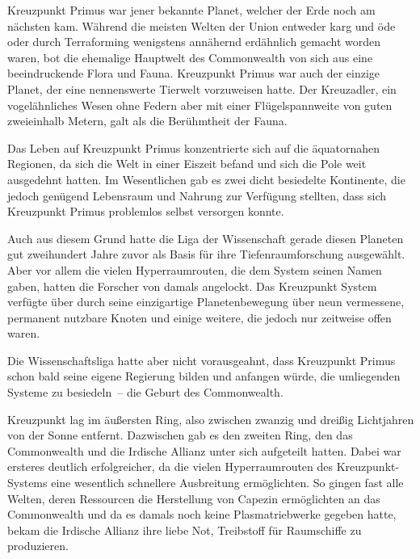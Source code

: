 Kreuzpunkt Primus war jener bekannte Planet, welcher der Erde noch am nächsten kam. Während die meisten Welten der Union entweder karg und öde oder durch Terraforming wenigstens annähernd erdähnlich gemacht worden waren, bot die ehemalige Hauptwelt des Commonwealth von sich aus eine beeindruckende Flora und Fauna. Kreuzpunkt Primus war auch der einzige Planet, der eine nennenswerte Tierwelt vorzuweisen hatte. Der Kreuzadler, ein vogelähnliches Wesen ohne Federn aber mit einer Flügelspannweite von guten zweieinhalb Metern, galt als die Berühmtheit der Fauna.

\par

Das Leben auf Kreuzpunkt Primus konzentrierte sich auf die äquatornahen Regionen, da sich die Welt in einer Eiszeit befand und sich die Pole weit ausgedehnt hatten. Im Wesentlichen gab es zwei dicht besiedelte Kontinente, die jedoch genügend Lebensraum und Nahrung zur Verfügung stellten, dass sich Kreuzpunkt Primus problemlos selbst versorgen konnte.

\par

Auch aus diesem Grund hatte die Liga der Wissenschaft gerade diesen Planeten gut zweihundert Jahre zuvor als Basis für ihre Tiefenraumforschung ausgewählt. Aber vor allem die vielen Hyperraumrouten, die dem System seinen Namen gaben, hatten die Forscher von damals angelockt. Das Kreuzpunkt System verfügte über durch seine einzigartige Planetenbewegung über neun vermessene, permanent nutzbare Knoten und einige weitere, die jedoch nur zeitweise offen waren.

\par

Die Wissenschaftsliga hatte aber nicht vorausgeahnt, dass Kreuzpunkt Primus schon bald seine eigene Regierung bilden und anfangen würde, die umliegenden Systeme zu besiedeln~-- die Geburt des Commonwealth.

\par

Kreuzpunkt lag im äußersten Ring, also zwischen zwanzig und dreißig Lichtjahren von der Sonne entfernt. Dazwischen gab es den zweiten Ring, den das Commonwealth und die Irdische Allianz unter sich aufgeteilt hatten. Dabei war ersteres deutlich erfolgreicher, da die vielen Hyperraumrouten des Kreuzpunkt-Systems eine wesentlich schnellere Ausbreitung ermöglichten. So gingen fast alle Welten, deren Ressourcen die Herstellung von Capezin ermöglichten an das Commonwealth und da es damals noch keine Plasmatriebwerke gegeben hatte, bekam die Irdische Allianz ihre liebe Not, Treibstoff für Raumschiffe zu produzieren.


